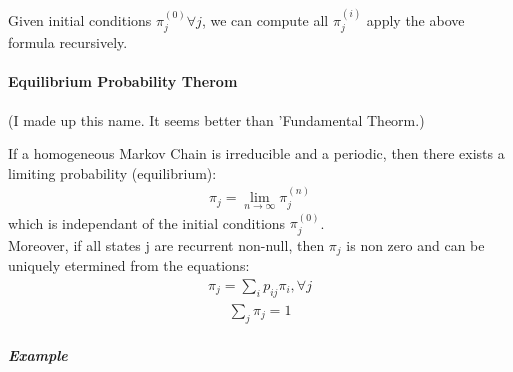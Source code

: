 Given initial conditions $\pi_j^{(0)} \forall j$, we can compute all
$\pi_j^{(i)}$ apply the above formula recursively.

\paragraph{Equilibrium Probability Therom} (I made up this name. It seems better
than 'Fundamental Theorm.)

If a homogeneous Markov Chain is irreducible and a periodic, then there exists a
limiting probability (equilibrium):
\begin{equation*} \begin{split}
	\pi_j = \lim_{n \to \infty} \pi_j^{(n)}
\end{split} \end{equation*}
which is independant of the initial conditions $\pi_j^{(0)}$. \\[0.5cm]

Moreover, if all states j are recurrent non-null, then $\pi_j$ is non zero and
can be uniquely etermined from the equations:
\begin{equation*} \begin{split}
	\pi_j = \sum_i p_{ij} \pi_i , \forall j
\end{split} \end{equation*}
\begin{equation*} \begin{split}
	\sum_j \pi_j = 1
\end{split} \end{equation*}

\subparagraph{Example}

\begin{figure}[!h]
\end{figure}

